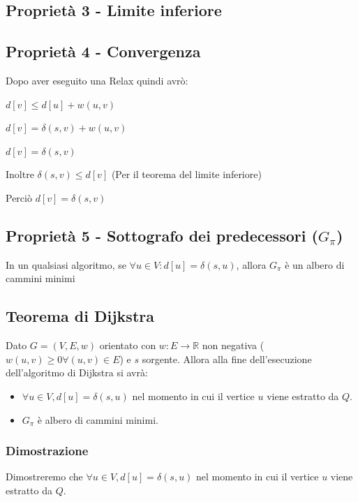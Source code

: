 \documentclass{article}
\providecommand{\tightlist}{%
  \setlength{\itemsep}{0pt}\setlength{\parskip}{0pt}}
\begin{document}
{\subsection{Proprietà 3 - Limite inferiore}

\subsection{Proprietà 4 - Convergenza}

%

{Dopo aver eseguito una Relax quindi avrò:}

$d[v] \leq d[u] + w(u,v)$

$d[v] = \delta(s,v) + w(u,v)$

$d[v] = \delta(s,v)$ 

Inoltre $\delta(s,v) \leq d[v]$ (Per il teorema del limite inferiore)

Perciò $d[v]=\delta(s,v)$

\subsection{Proprietà 5 - Sottografo dei predecessori ($G_\pi$)}

{In un qualsiasi algoritmo, se $\forall u \in V: d[u] = \delta(s,u)$, allora $G_\pi$ è un albero di cammini minimi}

\subsection{Teorema di Dijkstra}

{Dato $G=(V,E,w)$ orientato con $w:E\rightarrow \mathbb{R}$ non negativa ($w(u,v) \geq 0 \forall (u,v) \in E$) e $s$ sorgente. Allora alla fine dell'esecuzione dell'algoritmo di Dijkstra si avrà:}

\begin{itemize}
\tightlist
\item
{$\forall u \in V, d[u]=\delta(s,u)$ nel momento in cui il vertice $u$ viene estratto da $Q$.}
\item
{$G_\pi$ è albero di cammini minimi.}
\end{itemize}

\subsubsection{Dimostrazione}

{Dimostreremo che $\forall u \in V, d[u]=\delta(s,u)$ nel momento in cui il vertice $u$ viene estratto da $Q$.}

}
\end{document}
